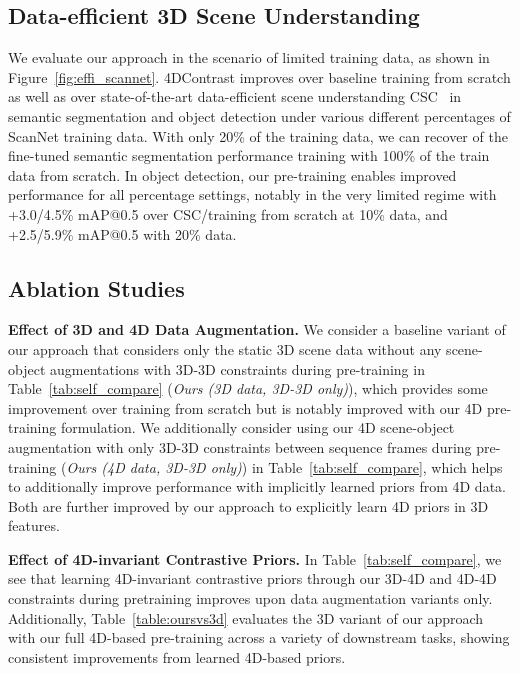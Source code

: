 \documentclass[runningheads]{llncs}
\newcommand{\OURS}{4DContrast}
\begin{document}
\subsection{Data-efficient 3D Scene Understanding}
\label{results:data-effi}
We evaluate our approach in the scenario of limited training data, as shown in Figure~\ref{fig:effi_scannet}. 
\OURS{} improves over baseline training from scratch as well as over state-of-the-art data-efficient scene understanding CSC~\cite{hou2021exploring} in semantic segmentation and object detection under various different percentages of ScanNet training data.
With only 20\% of the training data, we can recover  of the fine-tuned semantic segmentation performance training with 100\% of the train data from scratch.
In object detection, our pre-training enables improved performance for all percentage settings, notably in the very limited regime with +3.0/4.5\% mAP@0.5 over CSC/training from scratch at 10\% data, and +2.5/5.9\% mAP@0.5 with 20\% data.

\subsection{Ablation Studies}
\label{results:analysis}
\noindent \textbf{Effect of 3D and 4D Data Augmentation.}  
We consider a baseline variant of our approach that considers only the static 3D scene data without any scene-object augmentations with 3D-3D constraints during pre-training in \mbox{Table~\ref{tab:self_compare}} (\textit{Ours (3D data, 3D-3D only)}), which provides some improvement over training from scratch but is notably improved with our 4D pre-training formulation.
We additionally consider using our 4D scene-object augmentation with only 3D-3D constraints between sequence frames during pre-training (\textit{Ours (4D data, 3D-3D only)}) in Table~\ref{tab:self_compare}, which helps to additionally improve performance with implicitly learned priors from 4D data.
Both are further improved by our approach to explicitly learn 4D priors in 3D features.

\noindent \textbf{Effect of 4D-invariant Contrastive Priors.}
In Table~\ref{tab:self_compare}, we see that learning 4D-invariant contrastive priors through our 3D-4D and 4D-4D constraints during pretraining improves upon data augmentation variants only.
Additionally, Table~\ref{table:oursvs3d} evaluates the 3D variant of our approach with our full 4D-based pre-training across a variety of downstream tasks, showing consistent improvements from learned 4D-based priors. 
\end{document}
